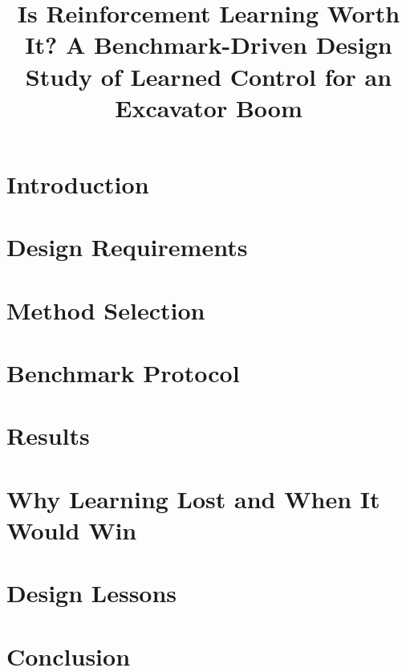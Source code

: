 \documentclass[conference]{IEEEtran}
\begin{document}
\title{Is Reinforcement Learning Worth It? A Benchmark-Driven Design Study of
Learned Control for an Excavator Boom}

\author{
}

\maketitle

\begin{abstract}

\end{abstract}


\section{Introduction}


\section{Design Requirements}


\section{Method Selection}


\section{Benchmark Protocol}


\section{Results}


\section{Why Learning Lost and When It Would Win}


\section{Design Lessons}


\section{Conclusion}


% 
% 
\end{document}
